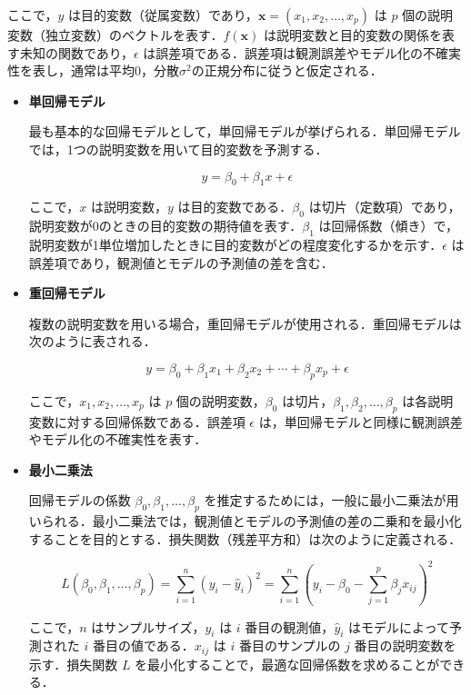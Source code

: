 ここで，$y$ は目的変数（従属変数）であり，$\mathbf{x} = (x_1, x_2, \ldots, x_p)$ は $p$ 個の説明変数（独立変数）のベクトルを表す．$f(\mathbf{x})$ は説明変数と目的変数の関係を表す未知の関数であり，$\epsilon$ は誤差項である．誤差項は観測誤差やモデル化の不確実性を表し，通常は平均0，分散$\sigma^2$の正規分布に従うと仮定される．
\begin{itemize}
	\item \textbf{単回帰モデル}
	
	最も基本的な回帰モデルとして，単回帰モデルが挙げられる．単回帰モデルでは，1つの説明変数を用いて目的変数を予測する．
	
	\begin{equation}
		y = \beta_0 + \beta_1 x + \epsilon
	\end{equation}
	
	ここで，$x$ は説明変数，$y$ は目的変数である．$\beta_0$ は切片（定数項）であり，説明変数が0のときの目的変数の期待値を表す．$\beta_1$ は回帰係数（傾き）で，説明変数が1単位増加したときに目的変数がどの程度変化するかを示す．$\epsilon$ は誤差項であり，観測値とモデルの予測値の差を含む．
	
	\item \textbf{重回帰モデル}
	
	複数の説明変数を用いる場合，重回帰モデルが使用される．重回帰モデルは次のように表される．
	
	\begin{equation}
		y = \beta_0 + \beta_1 x_1 + \beta_2 x_2 + \cdots + \beta_p x_p + \epsilon
	\end{equation}
	
	ここで，$x_1, x_2, \ldots, x_p$ は $p$ 個の説明変数，$\beta_0$ は切片，$\beta_1, \beta_2, \ldots, \beta_p$ は各説明変数に対する回帰係数である．誤差項 $\epsilon$ は，単回帰モデルと同様に観測誤差やモデル化の不確実性を表す．
	
	\item \textbf{最小二乗法}
	
	回帰モデルの係数 $\beta_0, \beta_1, \ldots, \beta_p$ を推定するためには，一般に最小二乗法が用いられる．最小二乗法では，観測値とモデルの予測値の差の二乗和を最小化することを目的とする．損失関数（残差平方和）は次のように定義される．
	
	\begin{equation}
		L(\beta_0, \beta_1, \ldots, \beta_p) = \sum_{i=1}^{n} (y_i - \hat{y}_i)^2 = \sum_{i=1}^{n} (y_i - \beta_0 - \sum_{j=1}^{p} \beta_j x_{ij})^2
	\end{equation}
	
	ここで，$n$ はサンプルサイズ，$y_i$ は $i$ 番目の観測値，$\hat{y}_i$ はモデルによって予測された $i$ 番目の値である．$x_{ij}$ は $i$ 番目のサンプルの $j$ 番目の説明変数を示す．損失関数 $L$ を最小化することで，最適な回帰係数を求めることができる．
	

\end{itemize}
